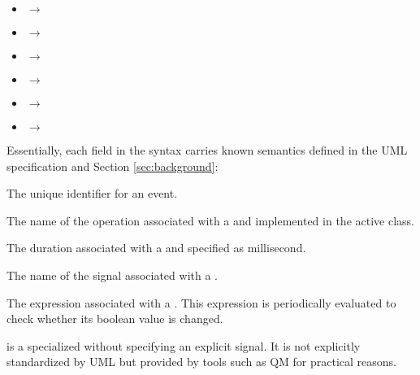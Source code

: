\noindent
{}
\begin{itemize}[\footnotesize]
	\item {} $\rightarrow$  
	
	\item {} $\rightarrow$  
	
	\item {} $\rightarrow$  
	
	\item {} $\rightarrow$  
	
	\item {} $\rightarrow$  
	
	\item {} $\rightarrow$  
\end{itemize}

\noindent
{}
Essentially, each field in the syntax carries known semantics defined in the UML specification and Section \ref{sec:background}:
\begin{description}[\footnotesize]
	\item[\ttt{name}] The unique identifier for an event.
	
	\item[\ttt{op}] The name of the operation associated with a  and implemented in the active class. 
	
	\item[\ttt{dur}] The duration associated with a  and specified as millisecond.
	
	\item[\ttt{sig}] The name of the signal associated with a .
	
	\item[\ttt{expr}] The expression associated with a . This expression is periodically evaluated to check whether its boolean value is changed.
\end{description}

 is a specialized  without specifying an explicit signal.
It is not explicitly standardized by UML but provided by tools such as QM \cite{qm} for practical reasons. 

\noindent
{}

